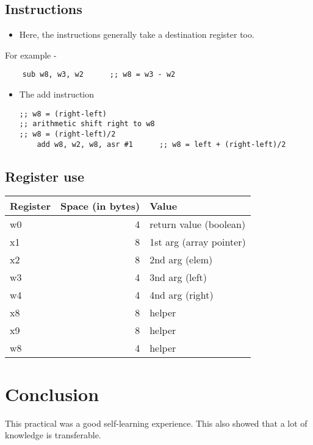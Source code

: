 \documentclass[11pt]{article}
\begin{document}
\subsection{Instructions}
\label{sec:org6c3e5ed}
\begin{itemize}
\item Here, the instructions generally take a destination register too.
\end{itemize}
For example -
\begin{verbatim}
	sub	w8, w3, w2      ;; w8 = w3 - w2
\end{verbatim}
\begin{itemize}
\item The add instruction
\begin{verbatim}
;; w8 = (right-left)
;; arithmetic shift right to w8
;; w8 = (right-left)/2
	add	w8, w2, w8, asr #1      ;; w8 = left + (right-left)/2
\end{verbatim}
\end{itemize}


\subsection{Register use}
\label{sec:orgf81973a}

\begin{center}
\begin{tabular}{lrl}
\hline
Register & Space (in bytes) & Value\\
\hline
w0 & 4 & return value (boolean)\\
x1 & 8 & 1st arg (array pointer)\\
x2 & 8 & 2nd arg (elem)\\
w3 & 4 & 3nd arg (left)\\
w4 & 4 & 4nd arg (right)\\
x8 & 8 & helper\\
x9 & 8 & helper\\
w8 & 4 & helper\\
\hline
\end{tabular}
\end{center}


\section{Conclusion}
\label{sec:org45ed4a7}
This practical was a good self-learning experience. This also showed that a lot of knowledge is transferable.
\end{document}
